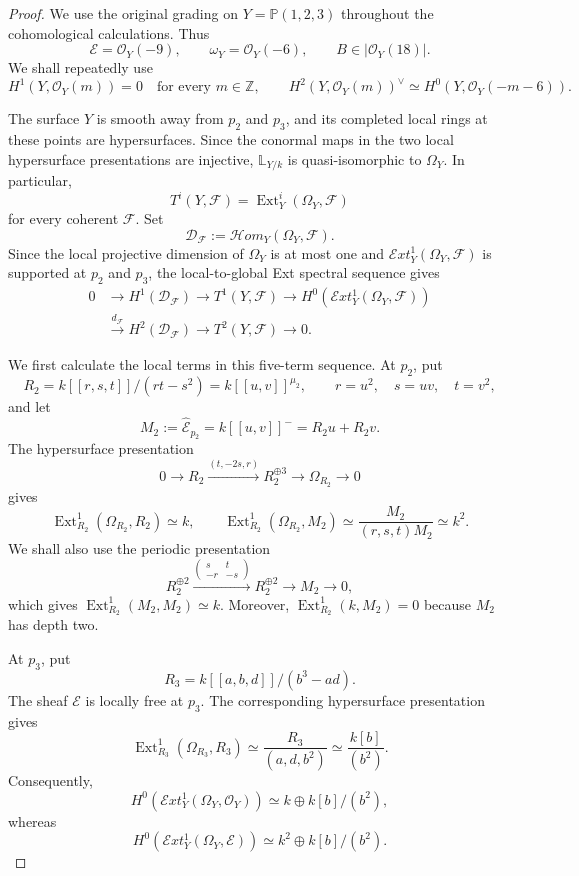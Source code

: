 \documentclass[11pt,twoside]{amsart}
\theoremstyle{plain}
\numberwithin{equation}{section}
\theoremstyle{definition}
\newcommand{\Ext}{\operatorname{Ext}}
\begin{document}
\begin{proof}
We use the original grading on $Y=\mathbb P(1,2,3)$ throughout the
cohomological calculations. Thus
$$
\mathcal E=\mathcal O_Y(-9),
\qquad
\omega_Y=\mathcal O_Y(-6),
\qquad
B\in|\mathcal O_Y(18)|.
$$
We shall repeatedly use
$$
H^1(Y,\mathcal O_Y(m))=0
\quad\text{for every }m\in\mathbb Z,
\qquad
H^2(Y,\mathcal O_Y(m))^\vee
\simeq H^0(Y,\mathcal O_Y(-m-6)).
$$

The surface $Y$ is smooth away from $p_2$ and $p_3$, and its completed
local rings at these points are hypersurfaces. Since the conormal maps in
the two local hypersurface presentations are injective, $\mathbb L_{Y/k}$
is quasi-isomorphic to $\Omega_Y$. In particular,
$$
T^i(Y,\mathcal F)=\Ext^i_Y(\Omega_Y,\mathcal F)
$$
for every coherent $\mathcal F$. Set
$$
\mathcal D_{\mathcal F}:=\mathcal H om_Y(\Omega_Y,\mathcal F).
$$
Since the local projective dimension of $\Omega_Y$ is at most one and
$\mathcal E xt^1_Y(\Omega_Y,\mathcal F)$ is supported at $p_2$ and $p_3$,
the local-to-global Ext spectral sequence gives
$$
\begin{aligned}
0&\longrightarrow H^1(\mathcal D_{\mathcal F})
\longrightarrow T^1(Y,\mathcal F)
\longrightarrow
H^0\!\left(\mathcal E xt^1_Y(\Omega_Y,\mathcal F)\right)\\
&\xrightarrow{d_{\mathcal F}}
H^2(\mathcal D_{\mathcal F})
\longrightarrow T^2(Y,\mathcal F)
\longrightarrow0.
\end{aligned}
$$

We first calculate the local terms in this five-term sequence. At $p_2$,
put
$$
R_2=k[[r,s,t]]/(rt-s^2)
=k[[u,v]]^{\mu_2},
\qquad
r=u^2,\quad s=uv,\quad t=v^2,
$$
and let
$$
M_2:=\widehat{\mathcal E}_{p_2}
=k[[u,v]]^-=R_2u+R_2v.
$$
The hypersurface presentation
$$
0\longrightarrow R_2
\xrightarrow{(t,-2s,r)}
R_2^{\oplus3}
\longrightarrow\Omega_{R_2}
\longrightarrow0
$$
gives
$$
\Ext^1_{R_2}(\Omega_{R_2},R_2)\simeq k,
\qquad
\Ext^1_{R_2}(\Omega_{R_2},M_2)
\simeq\frac{M_2}{(r,s,t)M_2}
\simeq k^2.
$$
We shall also use the periodic presentation
$$
R_2^{\oplus2}
\xrightarrow{
\left(\begin{smallmatrix}s&t\\-r&-s\end{smallmatrix}\right)}
R_2^{\oplus2}
\longrightarrow M_2
\longrightarrow0,
$$
which gives $\Ext^1_{R_2}(M_2,M_2)\simeq k$. Moreover,
$\Ext^1_{R_2}(k,M_2)=0$ because $M_2$ has depth two.

At $p_3$, put
$$
R_3=k[[a,b,d]]/(b^3-ad).
$$
The sheaf $\mathcal E$ is locally free at $p_3$. The corresponding
hypersurface presentation gives
$$
\Ext^1_{R_3}(\Omega_{R_3},R_3)
\simeq\frac{R_3}{(a,d,b^2)}
\simeq\frac{k[b]}{(b^2)}.
$$
Consequently,
$$
H^0\!\left(
\mathcal E xt^1_Y(\Omega_Y,\mathcal O_Y)
\right)
\simeq k\oplus k[b]/(b^2),
$$
whereas
$$
H^0\!\left(
\mathcal E xt^1_Y(\Omega_Y,\mathcal E)
\right)
\simeq k^2\oplus k[b]/(b^2).
$$


\end{proof}
\end{document}
